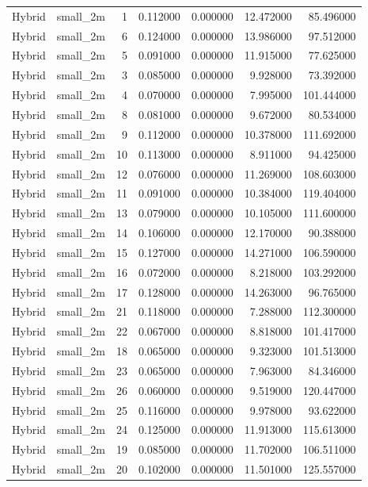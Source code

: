 \begin{tabular}{llrrrrr}
Hybrid & small_2m & 1 & 0.112000 & 0.000000 & 12.472000 & 85.496000 \\
Hybrid & small_2m & 6 & 0.124000 & 0.000000 & 13.986000 & 97.512000 \\
Hybrid & small_2m & 5 & 0.091000 & 0.000000 & 11.915000 & 77.625000 \\
Hybrid & small_2m & 3 & 0.085000 & 0.000000 & 9.928000 & 73.392000 \\
Hybrid & small_2m & 4 & 0.070000 & 0.000000 & 7.995000 & 101.444000 \\
Hybrid & small_2m & 8 & 0.081000 & 0.000000 & 9.672000 & 80.534000 \\
Hybrid & small_2m & 9 & 0.112000 & 0.000000 & 10.378000 & 111.692000 \\
Hybrid & small_2m & 10 & 0.113000 & 0.000000 & 8.911000 & 94.425000 \\
Hybrid & small_2m & 12 & 0.076000 & 0.000000 & 11.269000 & 108.603000 \\
Hybrid & small_2m & 11 & 0.091000 & 0.000000 & 10.384000 & 119.404000 \\
Hybrid & small_2m & 13 & 0.079000 & 0.000000 & 10.105000 & 111.600000 \\
Hybrid & small_2m & 14 & 0.106000 & 0.000000 & 12.170000 & 90.388000 \\
Hybrid & small_2m & 15 & 0.127000 & 0.000000 & 14.271000 & 106.590000 \\
Hybrid & small_2m & 16 & 0.072000 & 0.000000 & 8.218000 & 103.292000 \\
Hybrid & small_2m & 17 & 0.128000 & 0.000000 & 14.263000 & 96.765000 \\
Hybrid & small_2m & 21 & 0.118000 & 0.000000 & 7.288000 & 112.300000 \\
Hybrid & small_2m & 22 & 0.067000 & 0.000000 & 8.818000 & 101.417000 \\
Hybrid & small_2m & 18 & 0.065000 & 0.000000 & 9.323000 & 101.513000 \\
Hybrid & small_2m & 23 & 0.065000 & 0.000000 & 7.963000 & 84.346000 \\
Hybrid & small_2m & 26 & 0.060000 & 0.000000 & 9.519000 & 120.447000 \\
Hybrid & small_2m & 25 & 0.116000 & 0.000000 & 9.978000 & 93.622000 \\
Hybrid & small_2m & 24 & 0.125000 & 0.000000 & 11.913000 & 115.613000 \\
Hybrid & small_2m & 19 & 0.085000 & 0.000000 & 11.702000 & 106.511000 \\
Hybrid & small_2m & 20 & 0.102000 & 0.000000 & 11.501000 & 125.557000 \\

\end{tabular}
